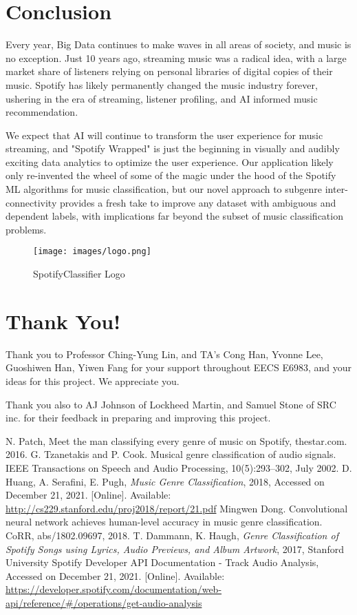 \documentclass[conference]{IEEEtran}
\begin{document}
\pagebreak
\section{Conclusion}
Every year, Big Data continues to make waves in all areas of society, and music is no exception. Just 10 years ago, streaming music was a radical idea, with a large market share of listeners relying on personal libraries of digital copies of their music. Spotify has likely permanently changed the music industry forever, ushering in the era of streaming, listener profiling, and AI informed music recommendation. 

We expect that AI will continue to transform the user experience for music streaming, and "Spotify Wrapped" is just the beginning in visually and audibly exciting data analytics to optimize the user experience. Our application likely only re-invented the wheel of some of the magic under the hood of the Spotify ML algorithms for music classification, but our novel approach to subgenre inter-connectivity provides a fresh take to improve any dataset with ambiguous and dependent labels, with implications far beyond the subset of music classification problems.

\begin{figure}[htbp]
\centerline{\texttt{[image: images/logo.png]}}
\caption{SpotifyClassifier Logo}
\label{fig:logo}
\end{figure}


\pagebreak
\section*{Thank You!}
Thank you to Professor Ching-Yung Lin, and TA's Cong Han, Yvonne Lee, Guoshiwen Han, Yiwen Fang for your support throughout EECS E6983, and your ideas for this project. We appreciate you.

Thank you also to AJ Johnson of Lockheed Martin, and Samuel Stone of SRC inc. for their feedback in preparing and improving this project.


\pagebreak
\begin{thebibliography}{00}
 N. Patch, Meet the man classifying every genre of music on Spotify, thestar.com. 2016.
 G. Tzanetakis and P. Cook. Musical genre classification of audio signals. IEEE Transactions on Speech and Audio Processing, 10(5):293–302, July 2002.
 D. Huang, A. Serafini, E. Pugh, \emph{Music Genre Classification}, 2018, Accessed on December 21, 2021. [Online]. Available: \url{http://cs229.stanford.edu/proj2018/report/21.pdf}
 Mingwen Dong. Convolutional neural network achieves human-level accuracy in music genre classification. CoRR, abs/1802.09697, 2018.
 T. Dammann, K. Haugh, \emph{Genre Classification of Spotify Songs using Lyrics, Audio Previews, and Album Artwork}, 2017, Stanford University
 Spotify Developer API Documentation - Track Audio Analysis, Accessed on December 21, 2021. [Online]. Available: \url{ https://developer.spotify.com/documentation/web-api/reference/#/operations/get-audio-analysis}

\end{thebibliography}
\end{document}
